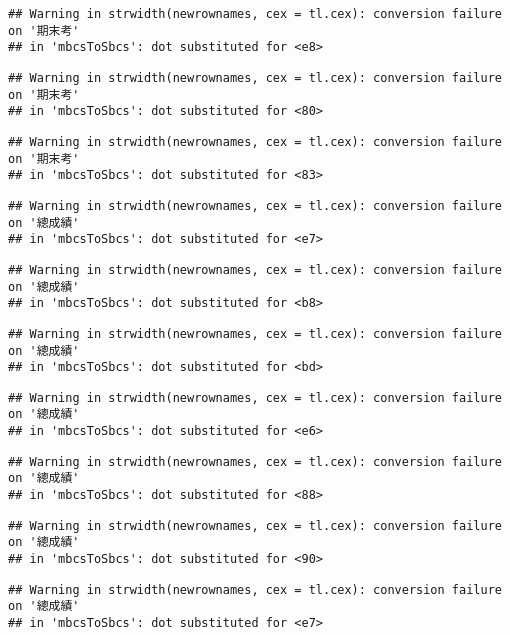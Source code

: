 \documentclass[
]{book}
\begin{document}
\begin{verbatim}
## Warning in strwidth(newrownames, cex = tl.cex): conversion failure on '期末考'
## in 'mbcsToSbcs': dot substituted for <e8>
\end{verbatim}

\begin{verbatim}
## Warning in strwidth(newrownames, cex = tl.cex): conversion failure on '期末考'
## in 'mbcsToSbcs': dot substituted for <80>
\end{verbatim}

\begin{verbatim}
## Warning in strwidth(newrownames, cex = tl.cex): conversion failure on '期末考'
## in 'mbcsToSbcs': dot substituted for <83>
\end{verbatim}

\begin{verbatim}
## Warning in strwidth(newrownames, cex = tl.cex): conversion failure on '總成績'
## in 'mbcsToSbcs': dot substituted for <e7>
\end{verbatim}

\begin{verbatim}
## Warning in strwidth(newrownames, cex = tl.cex): conversion failure on '總成績'
## in 'mbcsToSbcs': dot substituted for <b8>
\end{verbatim}

\begin{verbatim}
## Warning in strwidth(newrownames, cex = tl.cex): conversion failure on '總成績'
## in 'mbcsToSbcs': dot substituted for <bd>
\end{verbatim}

\begin{verbatim}
## Warning in strwidth(newrownames, cex = tl.cex): conversion failure on '總成績'
## in 'mbcsToSbcs': dot substituted for <e6>
\end{verbatim}

\begin{verbatim}
## Warning in strwidth(newrownames, cex = tl.cex): conversion failure on '總成績'
## in 'mbcsToSbcs': dot substituted for <88>
\end{verbatim}

\begin{verbatim}
## Warning in strwidth(newrownames, cex = tl.cex): conversion failure on '總成績'
## in 'mbcsToSbcs': dot substituted for <90>
\end{verbatim}

\begin{verbatim}
## Warning in strwidth(newrownames, cex = tl.cex): conversion failure on '總成績'
## in 'mbcsToSbcs': dot substituted for <e7>
\end{verbatim}
\end{document}
